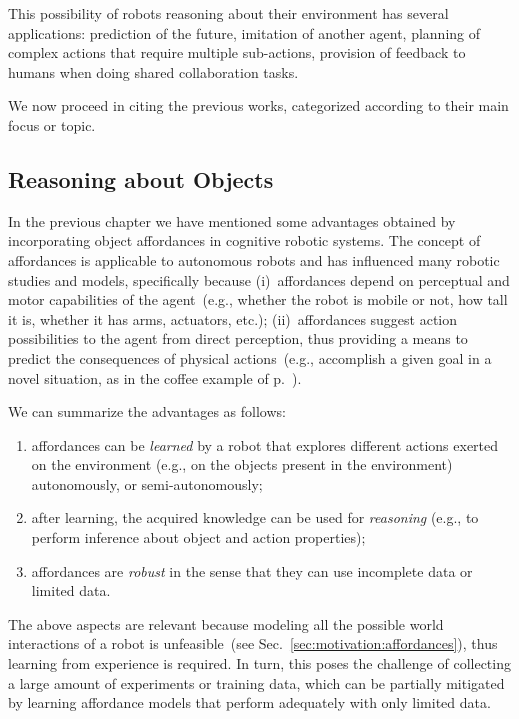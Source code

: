 This possibility of robots reasoning about their environment has several applications: prediction of the future, imitation of another agent, planning of complex actions that require multiple sub-actions, provision of feedback to humans when doing shared \hr{} collaboration tasks.

We now proceed in citing the previous works, categorized according to their main focus or topic.

\subsection{Reasoning about Objects}
\label{sec:background:previous_works:montesano}

In the previous chapter we have mentioned some advantages obtained by incorporating object affordances in cognitive robotic systems.
The concept of affordances is applicable to autonomous robots and has influenced many robotic studies and models, specifically because
(i)~affordances depend on perceptual and motor capabilities of the agent~(e.g., whether the robot is mobile or not, how tall it is, whether it has arms, actuators, etc.);
(ii)~affordances suggest action possibilities to the agent from direct perception, thus providing a means to predict the consequences of physical actions~(e.g., accomplish a given goal in a novel situation, as in the coffee example of p.~\pageref{coffee_example}).

We can summarize the advantages as follows:
\begin{enumerate}
    \item affordances can be \emph{learned} by a robot that explores different actions exerted on the environment (e.g., on the objects present in the environment) autonomously, or semi-autonomously;

    \item after learning, the acquired knowledge can be used for \emph{reasoning} (e.g., to perform inference about object and action properties);

    \item affordances are \emph{robust} in the sense that they can use incomplete data or limited data.
\end{enumerate}

The above aspects are relevant because modeling all the possible world interactions of a robot is unfeasible~(see Sec.~\ref{sec:motivation:affordances}), thus learning from experience is required.
In turn, this poses the challenge of collecting a large amount of experiments or training data, which can be partially mitigated by learning affordance models that perform adequately with only limited data.


